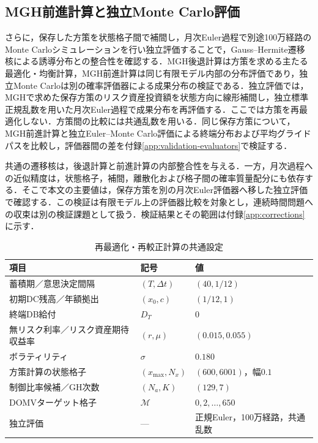\documentclass[10pt,a4paper]{article}
\theoremstyle{plain}
\theoremstyle{definition}
\begin{document}
\subsection{MGH前進計算と独立Monte Carlo評価}\label{sec:method-independent}
さらに，保存した方策を状態格子間で補間し，月次Euler過程で別途100万経路のMonte Carloシミュレーションを行い独立評価することで，Gauss--Hermite遷移核による誘導分布との整合性を確認する．MGH後退計算は方策を求める主たる最適化・均衡計算，MGH前進計算は同じ有限モデル内部の分布評価であり，独立Monte Carloは別の確率評価器による成果分布の検証である．独立評価では，MGHで求めた保存方策のリスク資産投資額を状態方向に線形補間し，独立標準正規乱数を用いた月次Euler過程で成果分布を再評価する．ここでは方策を再最適化しない．方策間の比較には共通乱数を用いる．同じ保存方策について，MGH前進計算と独立Euler--Monte Carlo評価による終端分布および平均グライドパスを比較し，評価器間の差を付録\ref{app:validation-evaluators}で検証する．

共通の遷移核は，後退計算と前進計算の内部整合性を与える．一方，月次過程への近似精度は，状態格子，補間，離散化および格子間の確率質量配分にも依存する．そこで本文の主要値は，保存方策を別の月次Euler評価器へ移した独立評価で確認する．この検証は有限モデル上の評価器比較を対象とし，連続時間問題への収束は別の検証課題として扱う．検証結果とその範囲は付録\ref{app:corrections}に示す．

\begin{table}[htbp]
\centering\small
\caption{再最適化・再較正計算の共通設定}
\label{tab:all-strategy-params}
\begin{tabular}{lll}
\toprule
項目 & 記号 & 値 \\
\midrule
蓄積期／意思決定間隔 & $(T,\Delta t)$ & $(40,1/12)$ \\
初期DC残高／年額拠出 & $(x_0,c)$ & $(1/12,1)$ \\
終端DB給付 & $D_T$ & $0$ \\
無リスク利率／リスク資産期待収益率 & $(r,\mu)$ & $(0.015,0.055)$ \\
ボラティリティ & $\sigma$ & $0.180$ \\
方策計算の状態格子 & $(x_{\max},N_x)$ & $(600,6001)$，幅$0.1$ \\
制御比率候補／GH次数 & $(N_a,K)$ & $(129,7)$ \\
DOMVターゲット格子 & $\mathcal M$ & $0,2,\ldots,650$ \\
独立評価 & --- & 正規Euler，100万経路，共通乱数 \\
\bottomrule
\end{tabular}
\end{table}
\end{document}
